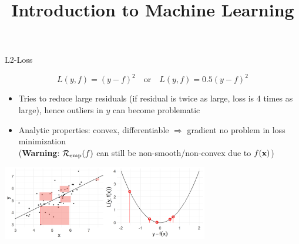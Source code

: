 \documentclass[11pt,compress,t,notes=noshow, xcolor=table]{beamer}
\title{Introduction to Machine Learning}
\institute{\href{https://compstat-lmu.github.io/lecture_i2ml/}{compstat-lmu.github.io/lecture\_i2ml}}
\date{}
\begin{document}

\begin{vbframe}{L2-Loss}

\vspace*{-0.5cm}

$$
L(y,f) = \left(y-f\right)^2 \quad \text{or} \quad L(y,f) = 0.5 \left(y-f\right)^2
$$

\vspace*{-2mm}

\begin{itemize}
\item Tries to reduce large residuals (if residual is twice as large, loss is 4 times as large), hence outliers in $y$ can become problematic
\item Analytic properties: convex, differentiable $\Rightarrow$ gradient no problem in loss minimization\\ {\small (\textbf{Warning}: $\mathcal{R}_{\text{emp}}(f)$ can still be non-smooth/non-convex due to $f(\mathbf{x})$)}
\end{itemize}






\begin{center}
  \includegraphics[width = 9cm]{figure/loss_quadratic_2.png} \\
\end{center}

\end{vbframe}
\end{document}
